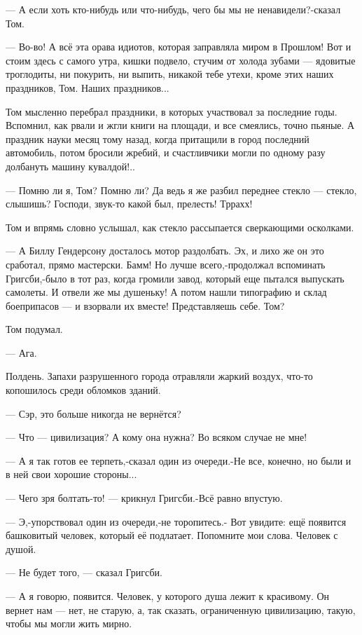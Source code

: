 — А если хоть кто-нибудь или что-нибудь, чего бы мы не ненавидели?-сказал Том.

— Во-во! А всё эта орава идиотов, которая заправляла миром в Прошлом! Вот и
стоим здесь с самого утра, кишки подвело, стучим от холода зубами — ядовитые
троглодиты, ни покурить, ни выпить, никакой тебе утехи, кроме этих наших
праздников, Том. Наших праздников...

Том мысленно перебрал праздники, в которых участвовал за последние годы.
Вспомнил, как рвали и жгли книги на площади, и все смеялись, точно пьяные. А
праздник науки месяц тому назад, когда притащили в город последний автомобиль,
потом бросили жребий, и счастливчики могли по одному разу долбануть машину
кувалдой!..

— Помню ли я, Том? Помню ли? Да ведь я же разбил переднее стекло — стекло,
слышишь? Господи, звук-то какой был, прелесть! Тррахх!

Том и впрямь словно услышал, как стекло рассыпается сверкающими осколками.

— А Биллу Гендерсону досталось мотор раздолбать. Эх, и лихо же он это сработал,
прямо мастерски. Бамм! Но лучше всего,-продолжал вспоминать Григсби,-было в тот
раз, когда громили завод, который еще пытался выпускать самолеты. И отвели же
мы душеньку! А потом нашли типографию и склад боеприпасов — и взорвали их
вместе! Представляешь себе. Том?

Том подумал.

— Ага.

Полдень. Запахи разрушенного города отравляли жаркий воздух, что-то копошилось
среди обломков зданий.

— Сэр, это больше никогда не вернётся?

— Что — цивилизация? А кому она нужна? Во всяком случае не мне!

— А я так готов ее терпеть,-сказал один из очереди.-Не все, конечно, но были и
в ней свои хорошие стороны...

— Чего зря болтать-то! — крикнул Григсби.-Всё равно впустую.

— Э,-упорствовал один из очереди,-не торопитесь.- Вот увидите: ещё появится
башковитый человек, который её подлатает. Попомните мои слова. Человек с душой.

— Не будет того, — сказал Григсби.

— А я говорю, появится. Человек, у которого душа лежит к красивому. Он вернет
нам — нет, не старую, а, так сказать, ограниченную цивилизацию, такую, чтобы мы
могли жить мирно.

